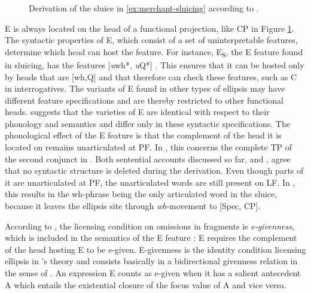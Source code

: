 \begin{figure}

\caption{Derivation of the sluice in \ref{ex:merchant-sluicing} according to \citet[670]{merchant2004}.\label{fig:merchant-sluicing}}

\end{figure}
%
E is always located on the head of a functional projection, like CP in Figure \ref{fig:merchant-sluicing}. The syntactic properties of E, which consist of a set of uninterpretable features, determine which head can host the feature. For instance, E\textsubscript{S}, the E feature found in sluicing, has the features [\textit{u}wh*, \textit{u}Q*] \citep[670]{merchant2004}. This ensures that it can be hosted only by heads that are [wh,Q] and that therefore can check these features, such as C in interrogatives. The variants of E found in other types of ellipsis may have different feature specifications and are thereby restricted to other functional heads. \citet[671]{merchant2004} suggests that the varieties of E are identical with respect to their phonology and semantics and differ only in these syntactic specifications. The phonological effect of the E feature is that the complement of the head it is located on  remains unarticulated at PF. In \Last, this concerns the complete TP of the second conjunct in \Last. Both sentential accounts discussed so far, \citet{merchant2004} and \citet{reich2007}, agree that no syntactic structure is deleted during the derivation. Even though parts of it are unarticulated at PF, the unarticulated words are still present on LF. In \Last, this results in the wh-phrase being the only articulated word in the sluice, because it leaves the ellipsis site through \textit{wh}-movement to [Spec, CP].

According to \citet{merchant2004}, the licensing condition on omissions in fragments is \textit{e-givenness}, which is included in the semantics of the E feature \Next: E requires the complement of the head hosting E to be e-given. E-givenness is the identity condition licensing ellipsis in \citeauthor{merchant2001}'s theory and consists basically in a bidirectional givenness relation in the sense of \citet{schwarzschild1999}. An expression E counts as e-given when it has a salient antecedent A which entails the existential closure of the focus value of A and vice versa. 

